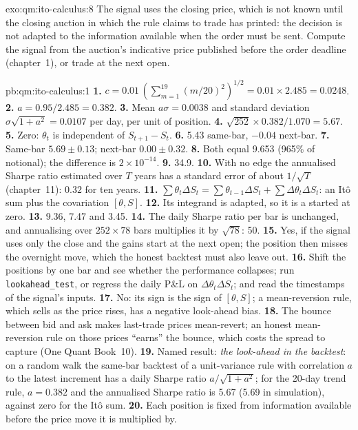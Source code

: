 \begin{solution}{exo:qm:ito-calculus:8}
The signal uses the closing price, which is not known until the closing auction in which the
rule claims to trade has printed: the decision is not adapted to the information available
when the order must be sent. Compute the signal from the auction's indicative price published
before the order deadline (chapter~1), or trade at the next open.
\end{solution}

\begin{solution}{pb:qm:ito-calculus:1}
\textbf{1.} $c = 0.01\,(\sum_{m=1}^{19}(m/20)^2)^{1/2} = 0.01 \times 2.485 = 0.0248$.
\textbf{2.} $a = 0.95/2.485 = 0.382$.
\textbf{3.} Mean $a\sigma = 0.0038$ and standard deviation $\sigma\sqrt{1 + a^2} = 0.0107$ per day, per
unit of position.
\textbf{4.} $\sqrt{252} \times 0.382/1.070 = 5.67$.
\textbf{5.} Zero: $\theta_{t}$ is independent of $S_{t+1} - S_t$.
\textbf{6.} 5.43 same-bar, $-0.04$ next-bar.
\textbf{7.} Same-bar $5.69 \pm 0.13$; next-bar $0.00 \pm 0.32$.
\textbf{8.} Both equal 9.653 (965\% of notional); the difference is $2 \times 10^{-14}$.
\textbf{9.} 34.9.
\textbf{10.} With no edge the annualised Sharpe ratio estimated over $T$ years has a standard error
of about $1/\sqrt T$ (chapter~11): $0.32$ for ten years.
\textbf{11.} $\sum\theta_t\Delta S_t = \sum\theta_{t-1}\Delta S_t + \sum\Delta\theta_t\Delta S_t$: an Itô sum plus the
covariation $[\theta, S]$.
\textbf{12.} Its integrand is adapted, so it is a  started at zero.
\textbf{13.} 9.36, 7.47 and 3.45.
\textbf{14.} The daily Sharpe ratio per bar is unchanged, and annualising over $252 \times 78$ bars
multiplies it by $\sqrt{78}$: 50.
\textbf{15.} Yes, if the signal uses only the close and the gains start at the next open; the
position then misses the overnight move, which the honest backtest must also leave out.
\textbf{16.} Shift the positions by one bar and see whether the performance collapses; run
\texttt{lookahead\_test}, or regress the daily P\&L on $\Delta\theta_t\Delta S_t$; and read the
timestamps of the signal's inputs.
\textbf{17.} No: its sign is the sign of $[\theta, S]$; a mean-reversion rule, which sells as the price
rises, has a negative look-ahead bias.
\textbf{18.} The bounce between bid and ask makes last-trade prices mean-revert; an honest
mean-reversion rule on those prices ``earns'' the bounce, which costs the spread to capture
(One Quant Book~10).
\textbf{19.} Named result: \emph{the look-ahead in the backtest}: on a random walk the same-bar
backtest of a unit-variance rule with correlation $a$ to the latest increment has a daily Sharpe
ratio $a/\sqrt{1 + a^2}$; for the 20-day trend rule, $a = 0.382$ and the annualised Sharpe ratio is 5.67
(5.69 in simulation), against zero for the Itô sum.
\textbf{20.} Each position is fixed from information available before the price move it is
multiplied by.
\end{solution}


